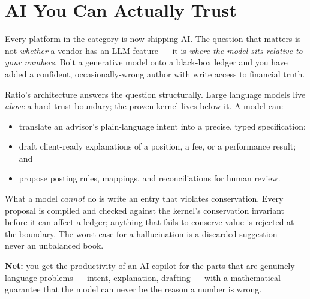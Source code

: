 \section{AI You Can Actually Trust}

Every platform in the category is now shipping AI. The question that matters is not
\emph{whether} a vendor has an LLM feature --- it is \emph{where the model sits
relative to your numbers}. Bolt a generative model onto a black-box ledger and you
have added a confident, occasionally-wrong author with write access to financial
truth.

Ratio's architecture answers the question structurally. Large language models live
\emph{above} a hard trust boundary; the proven kernel lives below it. A model can:

\begin{itemize}
  \item translate an advisor's plain-language intent into a precise, typed
  specification;
  \item draft client-ready explanations of a position, a fee, or a performance
  result; and
  \item propose posting rules, mappings, and reconciliations for human review.
\end{itemize}

\noindent What a model \emph{cannot} do is write an entry that violates
conservation. Every proposal is compiled and checked against the kernel's
conservation invariant before it can affect a ledger; anything that fails to
conserve value is rejected at the boundary. The worst case for a hallucination
is a discarded suggestion --- never an unbalanced book.

\begin{callout}
\sffamily\color{ratioInk}
\textbf{Net:} you get the productivity of an AI copilot for the parts that are
genuinely language problems --- intent, explanation, drafting --- with a
mathematical guarantee that the model can never be the reason a number is wrong.
\end{callout}
